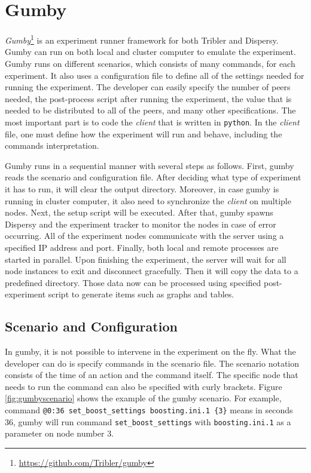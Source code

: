 \section{Gumby}
\label{section:gumby}
\textit{Gumby}\footnote{\url{https://github.com/Tribler/gumby}} is an experiment runner framework for both Tribler and Dispersy. Gumby can run on both local and cluster computer to emulate the experiment. Gumby runs on different scenarios, which consists of many commands, for each experiment. It also uses a configuration file to define all of the settings needed for running the experiment. The developer can easily specify the number of peers needed, the post-process script after running the experiment, the value that is needed to be distributed to all of the peers, and many other specifications. The most important part is to code the \textit{client} that is written in \texttt{python}. In the \textit{client} file, one must define how the experiment will run and behave, including the commands interpretation.

Gumby runs in a sequential manner with several steps as follows. First, gumby reads the scenario and configuration file. After deciding what type of experiment it has to run, it will clear the output directory. Moreover, in case gumby is running in cluster computer, it also need to synchronize the \textit{client} on multiple nodes. Next, the setup script will be executed. After that, gumby spawns Dispersy and the experiment tracker to monitor the nodes in case of error occurring. All of the experiment nodes communicate with the server using a specified IP address and port. Finally, both local and remote processes are started in parallel. Upon finishing the experiment, the server will wait for all node instances to exit and disconnect gracefully. Then it will copy the data to a predefined directory. Those data now can be processed using specified post-experiment script to generate items such as graphs and tables.

\subsection{Scenario and Configuration}
In gumby, it is not possible to intervene in the experiment on the fly. What the developer can do is specify commands in the scenario file. The scenario notation consists of the time of an action and the command itself. The specific node that needs to run the command can also be specified with curly brackets. Figure \ref{fig:gumbyscenario} shows the example of the gumby scenario. For example, command \texttt{@0:36 set\_boost\_settings boosting.ini.1 \{3\}} means in seconds 36, gumby will run command \texttt{set\_boost\_settings} with \texttt{boosting.ini.1} as a parameter on node number 3. 

